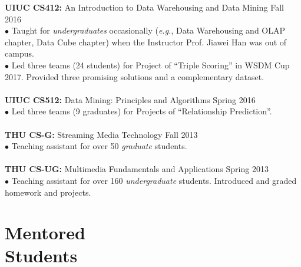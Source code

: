 \documentclass[margin, 10pt]{res}
\begin{document}
\begin{resume}
{\textbf{UIUC CS412:} An Introduction to Data Warehousing and Data Mining} \hfill{Fall 2016} \\
$\bullet$ Taught for \textit{undergraduates} occasionally (\textit{e.g.}, Data Warehousing and OLAP chapter, Data Cube chapter) when the Instructor Prof. Jiawei Han was out of campus. \\
$\bullet$ Led three teams (24 students) for Project of ``Triple Scoring'' in WSDM Cup 2017. Provided three promising solutions and a complementary dataset. \\ \\
{\textbf{UIUC CS512:} Data Mining: Principles and Algorithms} \hfill{Spring 2016} \\
$\bullet$ Led three teams (9 graduates) for Projects of ``Relationship Prediction''. \\ \\
{\textbf{THU CS-G:} Streaming Media Technology} \hfill{Fall 2013} \\
$\bullet$ Teaching assistant for over 50 \textit{graduate} students. \\ \\
{\textbf{THU CS-UG:} Multimedia Fundamentals and Applications} \hfill{Spring 2013} \\
$\bullet$ Teaching assistant for over 160 \textit{undergraduate} students. Introduced and graded homework and projects.


\section{Mentored \\ Students}


\end{resume}
\end{document}
